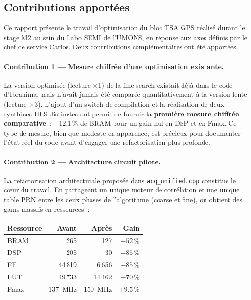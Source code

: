 \documentclass[11pt,a4paper]{article}
\begin{document}
\subsection{Contributions apportées}

Ce rapport présente le travail d'optimisation du bloc TSA GPS réalisé durant le stage M2 au sein du Labo SEMI de l'UMONS, en réponse aux axes définis par le chef de service Carlos. Deux contributions complémentaires ont été apportées.

\paragraph{Contribution 1 — Mesure chiffrée d'une optimisation existante.}
La version optimisée (lecture ×1) de la fine search existait déjà dans le code d'Ibrahima, mais n'avait jamais été comparée quantitativement à la version lente (lecture ×3). L'ajout d'un switch de compilation et la réalisation de deux synthèses HLS distinctes ont permis de fournir la \textbf{première mesure chiffrée comparative}~: $-12.1\,\%$ de BRAM pour un gain nul en DSP et en Fmax. Ce type de mesure, bien que modeste en apparence, est précieux pour documenter l'état réel du code avant d'engager une refactorisation plus profonde.

\paragraph{Contribution 2 — Architecture circuit pilote.}
La refactorisation architecturale proposée dans \texttt{acq\_unified.cpp} constitue le c\oe{}ur du travail. En partageant un unique moteur de corrélation et une unique table PRN entre les deux phases de l'algorithme (coarse et fine), on obtient des gains massifs en ressources~:

\begin{center}
\renewcommand{\arraystretch}{1.3}
\begin{tabular}{lrrr}
\toprule
\textbf{Ressource} & \textbf{Avant} & \textbf{Après} & \textbf{Gain} \\
\midrule
BRAM & 265 & 127 & $-52\,\%$ \\
DSP  & 205 &  30 & $-85\,\%$ \\
FF   & 44\,819 & 6\,656 & $-85\,\%$ \\
LUT  & 49\,733 & 14\,462 & $-70\,\%$ \\
Fmax & 137~MHz & 150~MHz & $+9.5\,\%$ \\
\bottomrule
\end{tabular}
\end{center}
\end{document}
